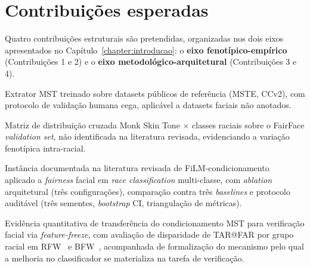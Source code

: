 \section{Contribuições esperadas}
\label{sec:contribuicoes}

Quatro contribuições estruturais são pretendidas, organizadas nos dois eixos apresentados no Capítulo~\ref{chapter:introducao}: o \textbf{eixo fenotípico-empírico} (Contribuições 1 e 2) e o \textbf{eixo metodológico-arquitetural} (Contribuições 3 e 4).

\begin{description}[font=\bfseries\sffamily]
\item[Contribuição 1.] Extrator MST treinado sobre datasets públicos de referência (MSTE, CCv2), com protocolo de validação humana cega, aplicável a datasets faciais não anotados.

\item[Contribuição 2.] Matriz de distribuição cruzada Monk Skin Tone $\times$ classes raciais sobre o FairFace \emph{validation set}, não identificada na literatura revisada, evidenciando a variação fenotípica intra-racial.

\item[Contribuição 3.] Instância documentada na literatura revisada de FiLM-condicionamento~\cite{perez2018film} aplicado a \emph{fairness} facial em \emph{race classification} multi-classe, com \emph{ablation} arquitetural (três configurações), comparação contra três \emph{baselines} e protocolo auditável (três sementes, \emph{bootstrap} CI, triangulação de métricas).

\item[Contribuição 4.] Evidência quantitativa de transferência do condicionamento MST para verificação facial via \emph{feature-freeze}, com avaliação de disparidade de TAR@FAR por grupo racial em RFW~\cite{wang2019racial} e BFW~\cite{robinson2020face}, acompanhada de formalização do mecanismo pelo qual a melhoria no classificador se materializa na tarefa de verificação.
\end{description}